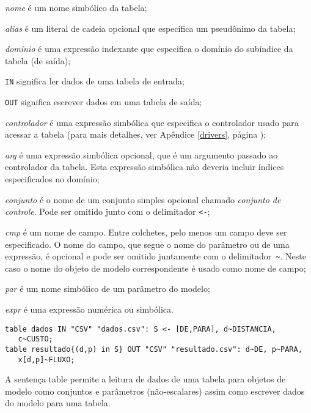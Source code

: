 \documentclass[11pt, brazil]{report}
\def\para#1{\noindent{\bf#1}}
\begin{document}
\medskip

\noindent
{\it nome} é um nome simbólico da tabela;

\noindent
{\it alias} é um literal de cadeia opcional que especifica um pseudônimo
da tabela;

\noindent
{\it domínio} é uma expressão indexante que especifica o domínio do
subíndice da tabela (de saída);

\noindent
{\tt IN} significa ler dados de uma tabela de entrada;

\noindent
{\tt OUT} significa escrever dados em uma tabela de saída;

\noindent
{\it controlador} é uma expressão simbólica que especifica o controlador
usado para acessar a tabela (para mais detalhes, ver Apêndice \ref{drivers},
página \pageref{drivers});

\noindent
{\it arg} é uma expressão simbólica opcional, que é um argumento
passado ao controlador da tabela. Esta expressão simbólica não deveria
incluir índices especificados no domínio;

\noindent
{\it conjunto} é o nome de um conjunto simples opcional chamado
{\it conjunto de controle}. Pode ser omitido junto com o delimitador {\tt<-};

\noindent
{\it cmp} é um nome de campo. Entre colchetes, pelo menos um campo deve ser
especificado. O nome do campo, que segue o nome do parâmetro ou de uma
expressão, é opcional e pode ser omitido juntamente com o
delimitador~{\tt\textasciitilde}. Neste caso o nome do objeto de modelo
correspondente é usado como nome de campo;

\noindent
{\it par} é um nome simbólico de um parâmetro do modelo;

\noindent
{\it expr} é uma expressão numérica ou simbólica.

\para{Exemplos}

\begin{verbatim}
table dados IN "CSV" "dados.csv": S <- [DE,PARA], d~DISTANCIA,
   c~CUSTO;
table resultado{(d,p) in S} OUT "CSV" "resultado.csv": d~DE, p~PARA,
   x[d,p]~FLUXO;
\end{verbatim}

A sentença table permite a leitura de dados de uma tabela para objetos
de modelo como conjuntos e parâmetros (não-escalares) assim como escrever
dados do modelo para uma tabela.
\end{document}
